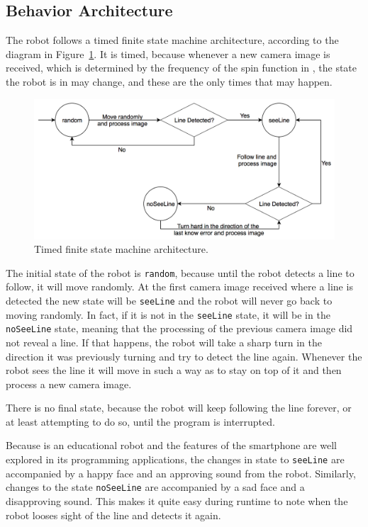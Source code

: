 \documentclass[10pt,conference,compsoc]{IEEEtran}
\begin{document}
\subsection{Behavior Architecture}

The robot follows a timed finite state machine architecture, according to the diagram in Figure~\ref{fig:architecture}. It is timed, because whenever a new camera image is received, which is determined by the frequency of the spin function in \ros, the state the robot is in may change, and these are the only times that may happen.

\begin{figure}[thpb]
\centering
\includegraphics[scale=0.34]{img/architecture.png}
\caption{Timed finite state machine architecture.}
\label{fig:architecture}
\end{figure}

The initial state of the robot is \texttt{random}, because until the robot detects a line to follow, it will move randomly. At the first camera image received where a line is detected the new state will be \texttt{seeLine} and the robot will never go back to moving randomly. In fact, if it is not in the \texttt{seeLine} state, it will be in the \texttt{noSeeLine} state, meaning that the processing of the previous camera image did not reveal a line. If that happens, the robot will take a sharp turn in the direction it was previously turning and try to detect the line again. Whenever the robot sees the line it will move in such a way as to stay on top of it and then process a new camera image.

There is no final state, because the robot will keep following the line forever, or at least attempting to do so, until the program is interrupted.

Because \robobo is an educational robot and the features of the smartphone are well explored in its programming applications, the changes in state to \texttt{seeLine} are accompanied by a happy face and an approving sound from the robot. Similarly, changes to the state \texttt{noSeeLine} are accompanied by a sad face and a disapproving sound. This makes it quite easy during runtime to note when the robot looses sight of the line and detects it again.
\end{document}

